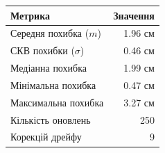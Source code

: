 \begin{tabular}{lr}
\toprule
Метрика & Значення \\
\midrule
Середня похибка ($m$) & 1.96 см \\
СКВ похибки ($\sigma$) & 0.46 см \\
Медіанна похибка & 1.99 см \\
Мінімальна похибка & 0.47 см \\
Максимальна похибка & 3.27 см \\
Кількість оновлень & 250 \\
Корекцій дрейфу & 9 \\
\bottomrule
\end{tabular}
